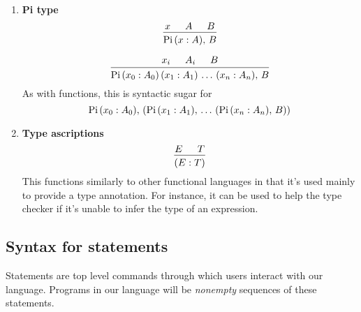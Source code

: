 \documentclass{article}
\begin{document}
\begin{enumerate}
\item \textbf{Pi type} \\
  \[
    \begin{prooftree}
      \hypo{x}
      \hypo{A}
      \hypo{B}
      \infer3{\Pii \, (x : A), \, B}
    \end{prooftree}
  \] 

  \[
    \begin{prooftree}
      \hypo{x_i}
      \hypo{A_i}
      \hypo{B}
      \infer3{\Pii \, (x_0 : A_0) \, (x_1 : A_1) \, \dots \, (x_n : A_n), \, B}
    \end{prooftree}
  \] 
  As with functions, this is syntactic sugar for
  \[ \operatorname{Pi} \, (x_0 : A_0), \, (\operatorname{Pi} \, (x_1 : A_1), \,  \dots \, (\operatorname{Pi} \, (x_n : A_n), \, B)) \]

\item \textbf{Type ascriptions} \\
  \[
    \begin{prooftree}
      \hypo{E}
      \hypo{T}
      \infer2{(E : T)}
    \end{prooftree}
  \]
  This functions similarly to other functional languages in that it's used
  mainly to provide a type annotation. For instance, it can be used to help the
  type checker if it's unable to infer the type of an expression.
\end{enumerate}

\subsection{Syntax for statements}
Statements are top level commands through which users interact with our
language. Programs in our language will be \textit{nonempty} sequences of
these statements.
\end{document}
